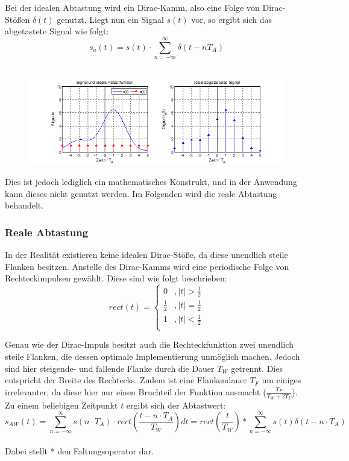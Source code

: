 Bei der idealen Abtastung wird ein Dirac-Kamm, also eine Folge von Dirac-Stößen $\delta(t)$ genutzt. Liegt nun ein Signal $s(t)$ vor, so ergibt sich das abgetastete Signal wie folgt:\\
$$s_a(t) = s(t) \cdot \sum_{n=-\infty}^{\infty} \delta(t - nT_A)$$\\

\begin{figure}[h!]
\centering
\includegraphics[scale=1]{images/abtastung_ideal.png}
\label{ideal_abtastung}
\end{figure}


Dies ist jedoch lediglich ein mathematisches Konstrukt, und in der Anwendung kann dieses nicht genutzt werden. Im Folgenden wird die reale Abtastung behandelt.

\subsubsection{Reale Abtastung}
In der Realität existieren keine idealen Dirac-Stöße, da diese unendlich steile Flanken besitzen. Anstelle des Dirac-Kamms wird eine periodische Folge von Rechteckimpulsen gewählt. Diese sind wie folgt beschrieben:\\
\begin{equation}
   rect(t) =
   \begin{cases}
     0 & ,|t| > \frac{1}{2}\\
     \frac{1}{2} & ,|t| = \frac{1}{2}\\
     1 & ,|t| < \frac{1}{2}\\
   \end{cases}
\end{equation}

Genau wie der Dirac-Impuls besitzt auch die Rechteckfunktion zwei unendlich steile Flanken, die dessen optimale Implementierung unmöglich machen. Jedoch sind hier steigende- und fallende Flanke durch die Dauer $T_W$ getrennt. Dies entspricht der Breite des Rechtecks. Zudem ist eine Flankendauer $T_F$  um einiges irrelevanter, da diese hier nur einen Bruchteil der Funktion ausmacht ($\frac{T_F}{T_W + 2T_F}$). \\
\newline
Zu einem beliebigen Zeitpunkt $t$ ergibt sich der Abtastwert:\\
$$s_{AW}(t) = \sum_{n=-\infty}^{\infty} s(n\cdot T_A) \cdot rect\left( \frac{t - n \cdot T_A}{T_W}\right) dt 
= rect\left(\frac{t}{T_W}\right) * \sum_{n=-\infty}^{\infty} s(t) \delta (t - n\cdot T_A)$$ \\
Dabei stellt $*$ den Faltungsoperator dar.


